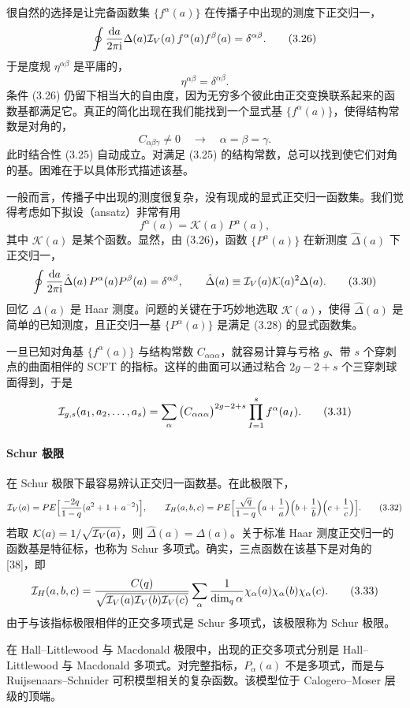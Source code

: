 很自然的选择是让完备函数集 $\{f^\alpha(a)\}$ 在传播子中出现的测度下正交归一，
\[
\oint\frac{\mathrm{d} a}{2\pi\mathrm{i}}\Delta(a)\mathcal{I}_V(a)\,f^\alpha(a)f^\beta(a)=\delta^{\alpha\beta} .
\tag{3.26}
\]
于是度规 $\eta^{\alpha\beta}$ 是平庸的，
\[
\eta^{\alpha\beta}=\delta^{\alpha\beta} .
\tag{3.27}
\]
条件 (3.26) 仍留下相当大的自由度，因为无穷多个彼此由正交变换联系起来的函数基都满足它。真正的简化出现在我们能找到一个显式基 $\{f^\alpha(a)\}$，使得结构常数是对角的，
\[
C_{\alpha\beta\gamma}\neq0\quad\to\quad\alpha=\beta=\gamma .
\tag{3.28}
\]
此时结合性 (3.25) 自动成立。对满足 (3.25) 的结构常数，总可以找到使它们对角的基。困难在于以具体形式描述该基。

一般而言，传播子中出现的测度很复杂，没有现成的显式正交归一函数集。我们觉得考虑如下拟设（ansatz）非常有用
\[
f^\alpha(a)=\mathcal{K}(a)\,P^\alpha(a) ,
\tag{3.29}
\]
其中 $\mathcal{K}(a)$ 是某个函数。显然，由 (3.26)，函数 $\{P^\alpha(a)\}$ 在新测度 $\hat\Delta(a)$ 下正交归一，
\[
\oint\frac{\mathrm{d} a}{2\pi\mathrm{i}}\hat\Delta(a)\,P^\alpha(a)P^\beta(a)=\delta^{\alpha\beta},\qquad
\hat\Delta(a)\equiv\mathcal{I}_V(a)\mathcal{K}(a)^2\Delta(a) .
\tag{3.30}
\]
回忆 $\Delta(a)$ 是 Haar 测度。问题的关键在于巧妙地选取 $\mathcal{K}(a)$，使得 $\hat\Delta(a)$ 是简单的已知测度，且正交归一基 $\{P^\alpha(a)\}$ 是满足 (3.28) 的显式函数集。

一旦已知对角基 $\{f^\alpha(a)\}$ 与结构常数 $C_{\alpha\alpha\alpha}$，就容易计算与亏格 $g$、带 $s$ 个穿刺点的曲面相伴的 SCFT 的指标。这样的曲面可以通过粘合 $2g-2+s$ 个三穿刺球面得到，于是
\[
\mathcal{I}_{g,s}(a_1,a_2,\ldots,a_s)=\sum_\alpha\big(C_{\alpha\alpha\alpha}\big)^{2g-2+s}\prod_{I=1}^{s}f^\alpha(a_I) .
\tag{3.31}
\]
\paragraph{Schur 极限} 在 Schur 极限下最容易辨认正交归一函数基。在此极限下，
\[
\mathcal{I}_V(a)=PE\Big[\frac{-2q}{1-q}(a^2+1+a^{-2})\Big],\qquad
\mathcal{I}_H(a,b,c)=PE\Big[\frac{\sqrt q}{1-q}\Big(a+\frac1a\Big)\Big(b+\frac1b\Big)\Big(c+\frac1c\Big)\Big] .
\tag{3.32}
\]
若取 $\mathcal{K}(a)=1/\sqrt{\mathcal{I}_V(a)}$，则 $\hat\Delta(a)=\Delta(a)$。关于标准 Haar 测度正交归一的函数基是特征标，也称为 Schur 多项式。确实，三点函数在该基下是对角的 [38]，即
\[
\mathcal{I}_H(a,b,c)=\frac{C(q)}{\sqrt{\mathcal{I}_V(a)\mathcal{I}_V(b)\mathcal{I}_V(c)}}\sum_\alpha\frac{1}{\dim_q\alpha}\chi_\alpha(a)\chi_\alpha(b)\chi_\alpha(c) .
\tag{3.33}
\]
由于与该指标极限相伴的正交多项式是 Schur 多项式，该极限称为 Schur 极限。

在 Hall–Littlewood 与 Macdonald 极限中，出现的正交多项式分别是 Hall–Littlewood 与 Macdonald 多项式。对完整指标，$P_\alpha(a)$ 不是多项式，而是与 Ruijsenaars–Schnider 可积模型相关的复杂函数。该模型位于 Calogero–Moser 层级的顶端。

